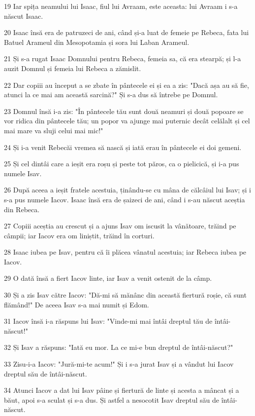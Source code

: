 \par 19 Iar spița neamului lui Isaac, fiul lui Avraam, este aceasta: lui Avraam i s-a născut Isaac.
\par 20 Isaac însă era de patruzeci de ani, când și-a luat de femeie pe Rebeca, fata lui Batuel Arameul din Mesopotamia și sora lui Laban Arameul.
\par 21 Și s-a rugat Isaac Domnului pentru Rebeca, femeia sa, că era stearpă; și l-a auzit Domnul și femeia lui Rebeca a zămislit.
\par 22 Dar copiii au început a se zbate în pântecele ei și ea a zis: "Dacă așa au să fie, atunci la ce mai am această sarcină?" Și s-a dus să întrebe pe Domnul.
\par 23 Domnul însă i-a zis: "În pântecele tău sunt două neamuri și două popoare se vor ridica din pântecele tău; un popor va ajunge mai puternic decât celălalt și cel mai mare va sluji celui mai mic!"
\par 24 Și i-a venit Rebecăi vremea să nască și iată erau în pântecele ei doi gemeni.
\par 25 Și cel dintâi care a ieșit era roșu și peste tot păros, ca o pielicică, și i-a pus numele Isav.
\par 26 După aceea a ieșit fratele acestuia, ținându-se cu mâna de călcâiul lui Isav; și i s-a pus numele Iacov. Isaac însă era de șaizeci de ani, când i s-au născut aceștia din Rebeca.
\par 27 Copiii aceștia au crescut și a ajuns Isav om iscusit la vânătoare, trăind pe câmpii; iar Iacov era om liniștit, trăind în corturi.
\par 28 Isaac iubea pe Isav, pentru că îi plăcea vânatul acestuia; iar Rebeca iubea pe Iacov.
\par 29 O dată însă a fiert Iacov linte, iar Isav a venit ostenit de la câmp.
\par 30 Și a zis Isav către Iacov: "Dă-mi să mănânc din această fiertură roșie, că sunt flămând!" De aceea Isav s-a mai numit și Edom.
\par 31 Iacov însă i-a răspuns lui Isav: "Vinde-mi mai întâi dreptul tău de întâi-născut!"
\par 32 Și Isav a răspuns: "Iată eu mor. La ce mi-e bun dreptul de întâi-născut?"
\par 33 Zisu-i-a Iacov: "Jură-mi-te acum!" Și i s-a jurat Isav și a vândut lui Iacov dreptul său de întâi-născut.
\par 34 Atunci Iacov a dat lui Isav pâine și fiertură de linte și acesta a mâncat și a băut, apoi s-a sculat și s-a dus. Și astfel a nesocotit Isav dreptul său de întâi-născut.

